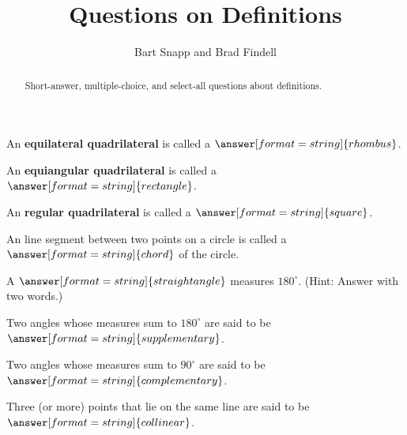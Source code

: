 \documentclass[nooutcomes]{ximera}
\title{Questions on Definitions}
\author{Bart Snapp and Brad Findell}
\begin{document}
\begin{abstract}
Short-answer, multiple-choice, and select-all questions about definitions. 
\end{abstract}
\maketitle

%


\begin{question}  
An \textbf{equilateral quadrilateral} is called a $\answer[format=string]{rhombus}$.
\end{question}

\begin{question}  
An \textbf{equiangular quadrilateral} is called a $\answer[format=string]{rectangle}$. 
\end{question}

\begin{question}  
An \textbf{regular quadrilateral} is called a $\answer[format=string]{square}$. 
\end{question}

\begin{question}  
An line segment between two points on a circle is called a $\answer[format=string]{chord}$ of the circle.  
\end{question}

\begin{question}  
A $\answer[format=string]{straight angle}$ measures $180^\circ$.  (Hint: Answer with two words.)
\end{question}

\begin{question}  
Two angles whose measures sum to $180^\circ$ are said to be $\answer[format=string]{supplementary}$.  
\end{question}

\begin{question}  
Two angles whose measures sum to $90^\circ$ are said to be $\answer[format=string]{complementary}$.  
\end{question}

\begin{question}  
Three (or more) points that lie on the same line are said to be $\answer[format=string]{collinear}$.  
\end{question}
\end{document}
